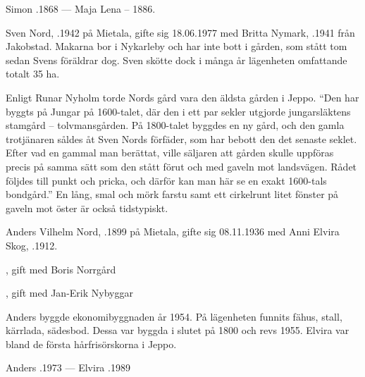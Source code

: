 Simon .1868  ---  Maja Lena  – 1886.



%



%
Sven Nord, .1942 på Mietala, gifte sig 18.06.1977 med Britta Nymark, .1941 från Jakobstad. Makarna bor i Nykarleby och har inte bott i gården, som stått tom sedan Svens föräldrar dog. Sven skötte dock i många år lägenheten omfattande totalt 35 ha.

Enligt Runar Nyholm torde Nords gård vara den äldsta gården i Jeppo. ``Den har byggts på Jungar på 1600-talet, där den i ett par sekler utgjorde jungarsläktens stamgård – tolvmansgården. På 1800-talet byggdes en ny gård, och den gamla trotjänaren såldes åt Sven Nords förfäder, som har bebott den det senaste seklet. Efter vad en gammal man berättat, ville säljaren att gården skulle uppföras precis på samma sätt som den stått förut och med gaveln mot landsvägen. Rådet följdes till punkt och pricka, och därför kan man här se en exakt 1600-tals bondgård.'' En lång, smal och mörk farstu samt ett cirkelrunt litet fönster på gaveln mot öster är också tidstypiskt.


%
Anders Vilhelm Nord, .1899 på Mietala, gifte sig 08.11.1936 med Anni Elvira Skog, .1912.
\begin{jhchildren}
  \item {}, gift med Boris Norrgård
  \item {}
  \item {}, gift med Jan-Erik Nybyggar
\end{jhchildren}

Anders byggde ekonomibyggnaden år 1954. På lägenheten funnits fähus, stall, kärrlada, sädesbod. Dessa var byggda i slutet på 1800 och revs 1955. Elvira var bland de första hårfrisörskorna i Jeppo.

Anders .1973  ---  Elvira .1989


